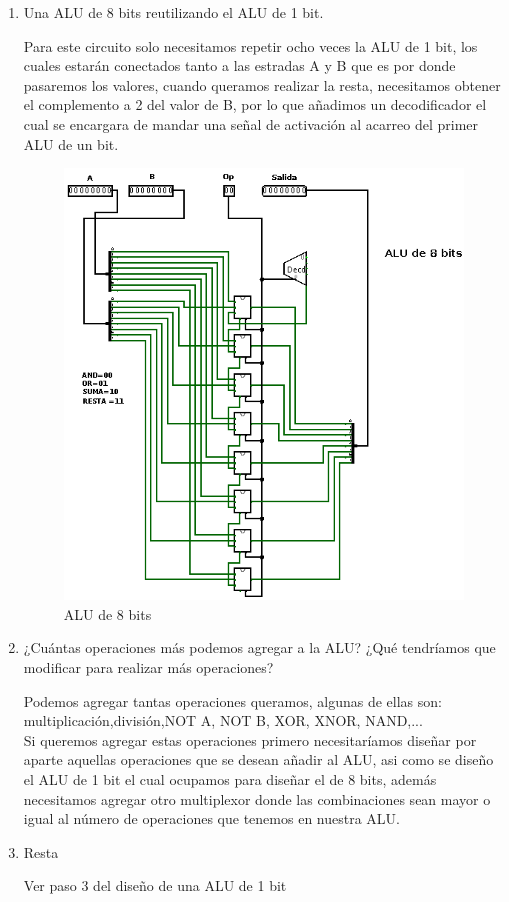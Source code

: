 \documentclass[10pt,letterpaper]{article}
\begin{document}
\begin{enumerate}
		\newpage
		
		\item Una ALU de 8 bits reutilizando el ALU de 1 bit.
		
		\hspace*{0.5cm} Para este circuito solo necesitamos repetir ocho veces la ALU de 1 bit, los cuales estarán conectados tanto a las estradas A y B que es por donde pasaremos los valores, cuando queramos realizar la resta, necesitamos obtener el complemento a 2 del valor de B, por lo que añadimos un decodificador el cual se encargara de mandar una señal de activación al acarreo del primer ALU de un bit.
		
		\begin{figure}[h!]
			\centering
			\includegraphics[scale=0.43]{ALUde8bits}
			\caption{ALU de 8 bits}
		\end{figure}
		
		\item ¿Cuántas operaciones más podemos agregar a la ALU? ¿Qué tendríamos que modificar para realizar más operaciones?
		
		\hspace*{0.5cm} Podemos agregar tantas operaciones queramos, algunas de ellas son: multiplicación,división,NOT A, NOT B, XOR, XNOR, NAND,...\\
		\hspace*{0.5cm} Si queremos agregar estas operaciones primero necesitaríamos diseñar por aparte aquellas operaciones que se desean añadir al ALU, asi como se diseño el ALU de 1 bit el cual ocupamos para diseñar el de 8 bits, además necesitamos agregar otro multiplexor donde las combinaciones sean mayor o igual al número de operaciones que tenemos en nuestra ALU.
		
		\item Resta
		
		Ver paso 3 del diseño de una ALU de 1 bit
		
	\end{enumerate}
	
\end{document}
